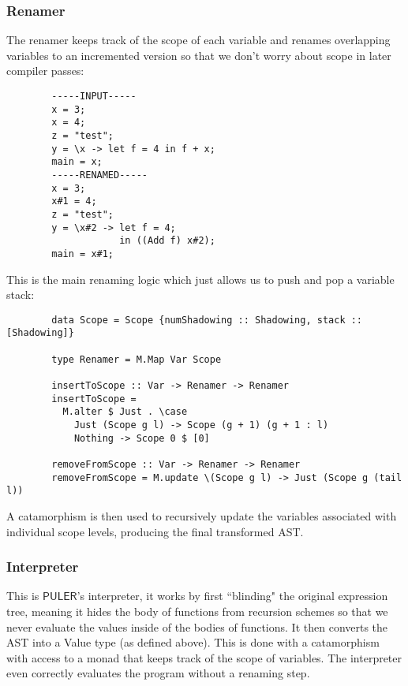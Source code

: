 \documentclass{article} %
\newcommand{\PULER}{\mathsf{PULER}}
\begin{document}
    \subsubsection{Renamer}\label{renamer}
    The renamer keeps track of the scope of each variable and renames overlapping variables to an incremented version so that we don't worry about scope in later compiler passes:
    \begin{verbatim}
        -----INPUT-----
        x = 3;
        x = 4;
        z = "test";
        y = \x -> let f = 4 in f + x;
        main = x;
        -----RENAMED-----
        x = 3;
        x#1 = 4;
        z = "test";
        y = \x#2 -> let f = 4;
                    in ((Add f) x#2);
        main = x#1;
    \end{verbatim}
    
    This is the main renaming logic which just allows us to push and pop a variable stack:
    \begin{verbatim}
        data Scope = Scope {numShadowing :: Shadowing, stack :: [Shadowing]}
        
        type Renamer = M.Map Var Scope
        
        insertToScope :: Var -> Renamer -> Renamer
        insertToScope =
          M.alter $ Just . \case
            Just (Scope g l) -> Scope (g + 1) (g + 1 : l)
            Nothing -> Scope 0 $ [0]
        
        removeFromScope :: Var -> Renamer -> Renamer
        removeFromScope = M.update \(Scope g l) -> Just (Scope g (tail l))
    \end{verbatim}
    A catamorphism is then used to recursively update the variables associated with individual scope levels, producing the final transformed AST.
    
    \subsubsection{Interpreter}\label{interpreter}
    This is $\PULER$'s interpreter, it works by first ``blinding" the original expression tree, meaning it hides the body of functions from recursion schemes so that we never evaluate the values inside of the bodies of functions. It then converts the AST into a Value type (as defined above).
    This is done with a catamorphism with access to a monad that keeps track of the scope of variables. The interpreter even correctly evaluates the program without a renaming step.
\end{document}
